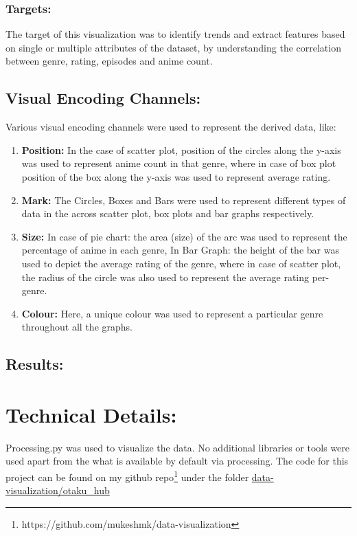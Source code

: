 \documentclass[a4paper, 10pt]{article}
\begin{document}
    \subsubsection{Targets:}
    \qquad The target of this visualization was to identify trends and extract features based on single or multiple attributes of the dataset, by understanding the correlation between genre, rating, episodes and anime count.
    \subsection{Visual Encoding Channels:}
    \qquad Various visual encoding channels were used to represent the derived data, like:
    \begin{enumerate}
        \item \textbf{Position:} In the case of scatter plot, position of the circles along the y-axis was used to represent anime count in that genre, where in case of box plot position of the box along the y-axis was used to represent average rating.
        \item \textbf{Mark:} The Circles, Boxes and Bars were used to represent different types of data in the across scatter plot, box plots and bar graphs respectively.
        \item \textbf{Size:} In case of pie chart: the area (size) of the arc was used to represent the percentage of anime in each genre, In Bar Graph: the height of the bar was used to depict the average rating of the genre, where in case of scatter plot, the radius of the circle was also used to represent the average rating per-genre.
        \item \textbf{Colour:} Here, a unique colour was used to represent a particular genre throughout all the graphs.
    \end{enumerate}
    \subsection{Results:}
\section{Technical Details:}
\qquad Processing.py was used to visualize the data. No additional libraries or tools were used apart from the what is available by default via processing. The code for this project can be found on my github repo\footnote{https://github.com/mukeshmk/data-visualization} under the folder \href{https://github.com/mukeshmk/data-visualization/tree/master/otaku_hub}{data-visualization/otaku\_hub}
\end{document}
